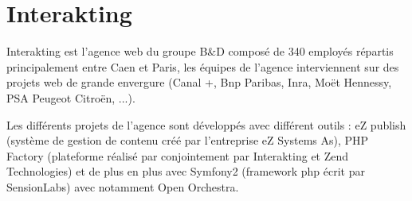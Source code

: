 \section{Interakting}


        Interakting est l'agence web du groupe B\&D  composé de 340 employés répartis principalement entre Caen et Paris, les équipes de l'agence interviennent sur des projets web  de grande envergure (Canal +, Bnp Paribas, Inra, Moët Hennessy, PSA Peugeot Citroën, ...).
        
  
        Les différents projets de l'agence sont développés avec différent outils : eZ publish (système de gestion de contenu créé par l'entreprise eZ Systems As), PHP Factory (plateforme réalisé par conjointement par Interakting et Zend Technologies) et de plus en plus avec Symfony2 (framework php écrit par SensionLabs) avec notamment Open Orchestra.

        
        
        